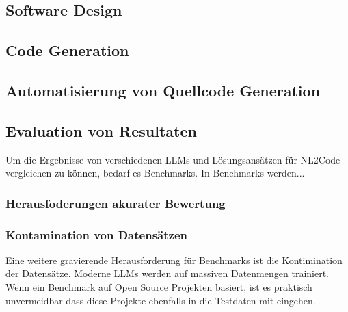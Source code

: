 \subsection{Software Design}

\subsection{Code Generation}

\subsection{Automatisierung von Quellcode Generation}

\subsection{Evaluation von Resultaten}

Um die Ergebnisse von verschiedenen LLMs und Lösungsansätzen für NL2Code vergleichen zu können, bedarf es Benchmarks. In Benchmarks werden... 

\subsubsection{Herausfoderungen akurater Bewertung}



\subsubsection{Kontamination von Datensätzen}

Eine weitere gravierende Herausforderung für Benchmarks ist die Kontimination der Datensätze. Moderne LLMs werden auf massiven Datenmengen trainiert. Wenn ein Benchmark auf Open Source Projekten basiert, ist es praktisch unvermeidbar dass diese Projekte ebenfalls in die Testdaten mit eingehen. 



